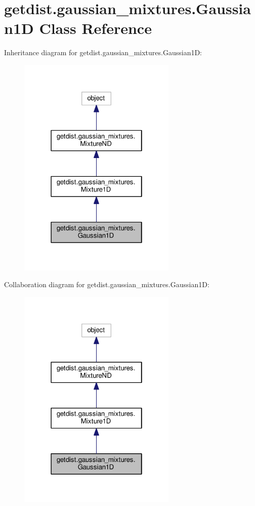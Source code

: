 \hypertarget{classgetdist_1_1gaussian__mixtures_1_1Gaussian1D}{}\section{getdist.\+gaussian\+\_\+mixtures.\+Gaussian1D Class Reference}
\label{classgetdist_1_1gaussian__mixtures_1_1Gaussian1D}


Inheritance diagram for getdist.\+gaussian\+\_\+mixtures.\+Gaussian1D\+:
\nopagebreak
\begin{figure}[H]
\begin{center}
\leavevmode
\includegraphics[width=214pt]{classgetdist_1_1gaussian__mixtures_1_1Gaussian1D__inherit__graph}
\end{center}
\end{figure}


Collaboration diagram for getdist.\+gaussian\+\_\+mixtures.\+Gaussian1D\+:
\nopagebreak
\begin{figure}[H]
\begin{center}
\leavevmode
\includegraphics[width=214pt]{classgetdist_1_1gaussian__mixtures_1_1Gaussian1D__coll__graph}
\end{center}
\end{figure}
